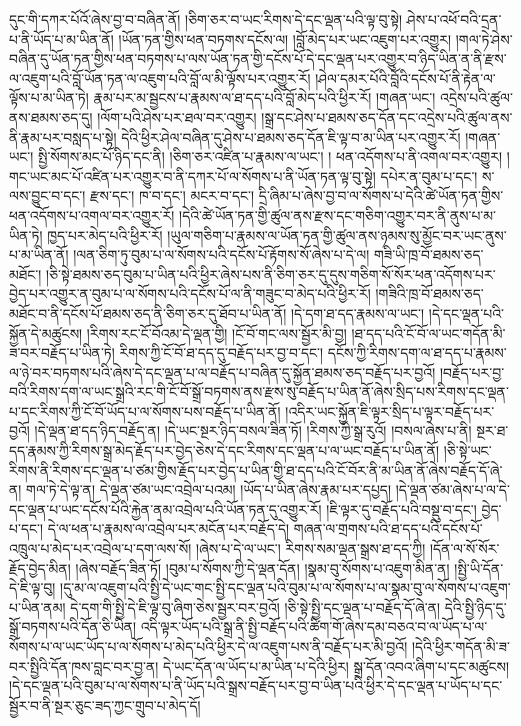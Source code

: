 དུང་གི་དཀར་པོའོ་ཞེས་བྱ་བ་བཞིན་ནོ། །ཅིག་ཅར་བ་ཡང་རིགས་དེ་དང་ལྡན་པའི་ལྟ་བུ་སྟེ། ཤེས་པ་འཕོ་བའི་དྲན་པ་ནི་ཡོད་པ་མ་ཡིན་ནོ། །ཡོན་ཏན་གྱིས་ཕན་བཏགས་དངོས་ལ། །བློ་མེད་པར་ཡང་འཇུག་པར་འགྱུར། །གལ་ཏེ་ཤེས་བཞིན་དུ་ཡོན་ཏན་གྱིས་ཕན་བཏགས་པ་ལས་ཡོན་ཏན་གྱི་དངོས་པོ་དེ་དང་ལྡན་པར་འགྱུར་བ་ཉིད་ཡིན་ན་ནི་རྫས་ལ་འཇུག་པའི་བློ་ཡོན་ཏན་ལ་འཇུག་པའི་བློ་ལ་མི་ལྟོས་པར་འགྱུར་རོ། །ཤེལ་དམར་པོའི་བློའི་དངོས་པོ་ནི་རྟེན་ལ་ལྟོས་པ་མ་ཡིན་ཏེ། རྣམ་པར་མ་སྦྱངས་པ་རྣམས་ལ་ཐ་དད་པའི་བློ་མེད་པའི་ཕྱིར་རོ། །གཞན་ཡང་། འདྲེས་པའི་ཚུལ་ནས་ཐམས་ཅད་དུ། །ལོག་པའི་ཤེས་པར་ཐལ་བར་འགྱུར། །སྒྲ་དང་ཤེས་པ་ཐམས་ཅད་དོན་དང་འདྲེས་པའི་ཚུལ་ནས་ནི་རྣམ་པར་བསླད་པ་སྟེ། དེའི་ཕྱིར་ཤེལ་བཞིན་དུ་ཤེས་པ་ཐམས་ཅད་དོན་ཇི་ལྟ་བ་མ་ཡིན་པར་འགྱུར་རོ། །གཞན་ཡང་། སྤྱི་སོགས་མང་པོ་ཉིད་དང་ནི། །ཅིག་ཅར་འཛིན་པ་རྣམས་ལ་ཡང་། །
ཕན་འདོགས་པ་ནི་འགལ་བར་འགྱུར། །གང་ཡང་མང་པོ་འཛིན་པར་འགྱུར་བ་ནི་དཀར་པོ་ལ་སོགས་པ་ནི་ཡོན་ཏན་ལྟ་བུ་སྟེ། དཔེར་ན་བུམ་པ་དང་། ས་ལས་བྱུང་བ་དང་། རྫས་དང་། ཁ་བ་དང་། མངར་བ་དང་། དྲི་ཞིམ་པ་ཞེས་བྱ་བ་ལ་སོགས་པ་དེའི་ཚེ་ཡོན་ཏན་གྱིས་ཕན་འདོགས་པ་འགལ་བར་འགྱུར་རོ། །དེའི་ཚེ་ཡོན་ཏན་གྱི་ཚུལ་ནས་རྫས་དང་གཅིག་འགྱུར་བར་ནི་ནུས་པ་མ་ཡིན་ཏེ། ཁྱད་པར་མེད་པའི་ཕྱིར་རོ། །ཡུལ་གཅིག་པ་རྣམས་ལ་ཡོན་ཏན་གྱི་ཚུལ་ནས་ཉམས་སུ་མྱོང་བར་ཡང་ནུས་པ་མ་ཡིན་ནོ། །ལན་ཅིག་ཏུ་བུམ་པ་ལ་སོགས་པའི་དངོས་པོ་རྟོགས་སོ་ཞེས་པ་དེ་ལ། གཟི་ཡི་ཁྲ་བོ་ཐམས་ཅད་མཐོང་། །ཅི་སྟེ་ཐམས་ཅད་བུམ་པ་ཡིན་པའི་ཕྱིར་ཞེས་པས་ནི་ཅིག་ཅར་དུ་དུས་གཅིག་སོ་སོར་ཕན་འདོགས་པར་བྱེད་པར་འགྱུར་ན་བུམ་པ་ལ་སོགས་པའི་དངོས་པོ་ལ་ནི་གཟུང་བ་མེད་པའི་ཕྱིར་རོ། །གཟིའི་ཁྲ་བོ་ཐམས་ཅད་མཐོང་བ་ནི་དངོས་པོ་ཐམས་ཅད་ནི་ཅིག་ཅར་དུ་ཐོབ་པ་ཡིན་ནོ། །དེ་དག་ཐ་དད་རྣམས་ལ་ཡང་། །དེ་དང་ལྡན་པའི་སྐྱོན་དེ་མཚུངས། །རིགས་རང་ངོ་བོའམ་དེ་ལྡན་གྱི། །ངོ་བོ་གང་ལས་སྦྱོར་མི་བྱ། །ཐ་དད་པའི་ངོ་བོ་ལ་ཡང་གདོན་མི་ཟ་བར་བརྗོད་པ་ཡིན་ཏེ། རིགས་ཀྱི་ངོ་བོ་ཐ་དད་དུ་བརྗོད་པར་བྱ་བ་དང་། དངོས་ཀྱི་རིགས་དག་ལ་ཐ་དད་པ་རྣམས་ལ་ཉེ་བར་བཏགས་པའི་ཞེས་དེ་དང་ལྡན་པ་ལ་བརྗོད་པ་བཞིན་དུ་སྐྱོན་ཐམས་ཅད་བརྗོད་པར་བྱའོ། །བརྗོད་པར་བྱ་བའི་རིགས་དག་ལ་ཡང་སྒྲའི་རང་གི་ངོ་བོ་སྒྲོ་བཏགས་ནས་རྫས་སུ་བརྗོད་པ་ཡིན་ནོ་ཞེས་སྲིད་པས་རིགས་དང་ལྡན་པ་དང་རིགས་ཀྱི་ངོ་བོ་ཡོད་པ་ལ་སོགས་པས་བརྗོད་པ་ཡིན་ནོ། །འདིར་ཡང་སྐྱོན་ཇི་ལྟར་སྲིད་པ་ལྟར་བརྗོད་པར་བྱའོ། །དེ་ལྡན་ཐ་དད་ཉིད་བརྗོད་ན། །དེ་ཡང་སྔར་ཉིད་བསལ་ཟིན་ཏོ། །རིགས་ཀྱི་སྒྲ་རུའོ། །བསལ་ཞེས་པ་ནི། སྔར་ཐ་དད་རྣམས་ཀྱི་རིགས་སྒྲ་མེད་རྗོད་པར་བྱེད་ཅེས་དེ་དང་རིགས་དང་ལྡན་པ་ལ་ཡང་བརྗོད་པ་ཡིན་ནོ། །ཅི་སྟེ་ཡང་རིགས་ནི་རིགས་དང་ལྡན་པ་ཙམ་གྱིས་རྗོད་པར་བྱེད་པ་ཡིན་གྱི་ཐ་དད་པའི་ངོ་བོར་ནི་མ་ཡིན་ནོ་ཞེས་བརྗོད་དོ་ཞེ་ན། གལ་ཏེ་དེ་ལྟ་ན། དེ་ལྡན་ཙམ་ཡང་འབྲེལ་པའམ། །ཡོད་པ་ཡིན་ཞེས་རྣམ་པར་དཔྱད། །དེ་ལྡན་ཙམ་ཞེས་པ་ལ་དེ་དང་ལྡན་པ་ཡང་དངོས་པོའི་རྐྱེན་ནམ་འབྲེལ་པའི་ཡོན་ཏན་དུ་འགྱུར་རོ། །ཇི་ལྟར་དུ་བརྗོད་པའི་བསྡུ་བ་དང་། བྱེད་པ་དང་། དེ་ལ་ཕན་པ་རྣམས་ལ་འབྲེལ་པར་མངོན་པར་བརྗོད་དེ། གཞན་ལ་གྲགས་པའི་ཐ་དད་པའི་དངོས་པོ་འཁྲུལ་པ་མེད་པར་འབྲེལ་པ་དག་ལས་སོ། །ཞེས་པ་དེ་ལ་ཡང་། རིགས་སམ་ལྡན་སྒྲས་ཐ་དད་ཀྱི། །དོན་ལ་སོ་སོར་རྗོད་བྱེད་མིན། །ཞེས་བརྗོད་ཟིན་ཏོ། །བུམ་པ་སོགས་ཀྱི་དེ་ལྡན་དོན། །སྣམ་བུ་སོགས་པ་འཇུག་མིན་ན། །སྤྱི་ཡི་དོན་དེ་ཇི་ལྟ་བུ། །དུ་མ་ལ་འཇུག་པའི་སྤྱི་དེ་ཡང་གང་སྤྱི་དང་ལྡན་པའི་བུམ་པ་ལ་སོགས་པ་ལ་སྣམ་བུ་ལ་སོགས་པ་འཇུག་པ་ཡིན་ནམ། དེ་དག་གི་སྤྱི་དེ་ཇི་ལྟ་བུ་ཞིག་ཅེས་སྦྱར་བར་བྱའོ། །ཅི་སྟེ་སྤྱི་དང་ལྡན་པ་བརྗོད་དོ་ཞེ་ན། དེའི་སྤྱི་ཉིད་དུ་སྒྲོ་བཏགས་པའི་དོན་ཅི་ཡིན། འདི་ལྟར་ཡོད་པའི་སྒྲ་ནི་སྤྱི་བརྗོད་པའི་ཚིག་གོ་ཞེས་དམ་བཅའ་བ་ལ་ཡོད་པ་ལ་སོགས་པ་ལ་ཡང་ཡོད་པ་ལ་སོགས་པ་མེད་པའི་ཕྱིར་དེ་ལ་འཇུག་པས་ནི་བརྗོད་པར་མི་བྱའོ། །དེའི་ཕྱིར་གདོན་མི་ཟ་བར་སྤྱིའི་དོན་ཁས་བླང་བར་བྱ་ན། དེ་ཡང་དོན་ལ་ཡོད་པ་མ་ཡིན་པ་དེའི་ཕྱིར། སྒྲ་དོན་འབའ་ཞིག་པ་དང་མཚུངས། །དེ་དང་ལྡན་པའི་བུམ་པ་ལ་སོགས་པ་ནི་ཡོད་པའི་སྒྲས་བརྗོད་པར་བྱ་བ་ཡིན་པའི་ཕྱིར་དེ་དང་ལྡན་པ་ཡོད་པ་དང་སྦྱོར་བ་ནི་སྔར་ཅུང་ཟད་ཀྱང་གྲུབ་པ་མེད་དོ། 